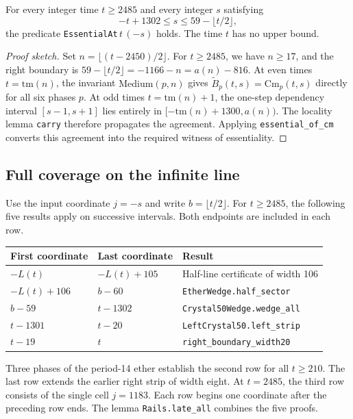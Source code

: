 \begin{theorem}\label{thm:wedge_all}
For every integer time $t \ge 2485$ and every integer $s$ satisfying
\begin{equation}\label{eq:wedge_region}
-t + 1302 \le s \le 59 - \lfloor t/2 \rfloor,
\end{equation}
the predicate \texttt{EssentialAt}\,$t\,(-s)$ holds. The time $t$ has no upper bound.
\end{theorem}

\begin{proof}[Proof sketch]
Set $n = \lfloor (t - 2450) / 2 \rfloor$. For $t \ge 2485$, we have $n \ge 17$, and the right boundary is $59 - \lfloor t/2 \rfloor = -1166 - n = a(n) - 816$. At even times $t = \mathrm{tm}(n)$, the invariant $\mathrm{Medium}(p, n)$ gives $\widetilde B_p(t, s) = \mathrm{Cm}_p(t, s)$ directly for all six phases $p$. At odd times $t = \mathrm{tm}(n) + 1$, the one-step dependency interval $[s - 1, s + 1]$ lies entirely in $[-\mathrm{tm}(n) + 1300, a(n))$. The locality lemma \texttt{carry} therefore propagates the agreement. Applying \texttt{essential\_of\_cm} converts this agreement into the required witness of essentiality.
\end{proof}

\subsection{Full coverage on the infinite line}\label{sec:five-bands}
Use the input coordinate $j=-s$ and write $b=\lfloor t/2\rfloor$. For $t\ge2485$, the following five results apply on successive intervals. Both endpoints are included in each row.
\begin{center}
\begin{tabular}{lll}
\toprule
First coordinate & Last coordinate & Result \\
\midrule
$-L(t)$ & $-L(t)+105$ & Half-line certificate of width 106 \\
$-L(t)+106$ & $b-60$ & \texttt{EtherWedge.half\_sector} \\
$b-59$ & $t-1302$ & \texttt{Crystal50Wedge.wedge\_all} \\
$t-1301$ & $t-20$ & \texttt{LeftCrystal50.left\_strip} \\
$t-19$ & $t$ & \texttt{right\_boundary\_width20} \\
\bottomrule
\end{tabular}
\end{center}
Three phases of the period-14 ether establish the second row for all $t\ge210$. The last row extends the earlier right strip of width eight. At $t=2485$, the third row consists of the single cell $j=1183$. Each row begins one coordinate after the preceding row ends. The lemma \texttt{Rails.late\_all} combines the five proofs.

